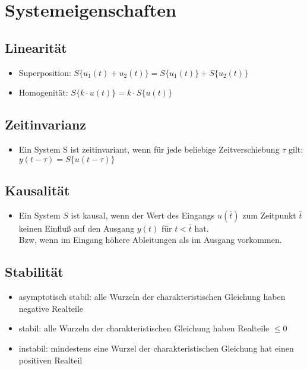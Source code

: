 \documentclass[german]{latex4ei/latex4ei_sheet}
\begin{document}
\section{Systemeigenschaften}
\begin{sectionbox}
    \subsection{Linearität}
    \vspace{1mm}
    \begin{itemize}
        \item Superposition: $S\{u_1(t) + u_2(t)\} = S\{u_1(t)\} + S\{u_2(t)\}$
        \item Homogenität: $S\{k \cdot u(t)\} = k \cdot S\{u(t)\}$
    \end{itemize}
    \subsection{Zeitinvarianz}
    \vspace{1mm}
    \begin{itemize}
        \item Ein System S ist zeitinvariant, wenn für jede beliebige Zeitverschiebung $τ$ gilt:
        $y(t −τ) = S\{u(t −τ)\}$
    \end{itemize}
    \subsection{Kausalität}
    \vspace{1mm}
    \begin{itemize}
        \item Ein System $S$ ist kausal, wenn der Wert des Eingangs $u(\bar{t})$ zum Zeitpunkt $\bar{t}$ keinen
        Einfluß auf den Ausgang $y(t)$ für $t < \bar{t}$ hat. \\
        Bzw, wenn im Eingang höhere Ableitungen als im Ausgang vorkommen.
    \end{itemize}

    \subsection{Stabilität}
    \vspace{1mm}
    \begin{itemize}
        \item asymptotisch stabil: alle Wurzeln der charakteristischen Gleichung haben negative Realteile
        \item stabil: alle Wurzeln der charakteristischen Gleichung haben Realteile $\leq 0$
        \item instabil: mindestens eine Wurzel der charakteristischen Gleichung hat einen positiven Realteil
    \end{itemize}
    
\end{sectionbox}
\end{document}
